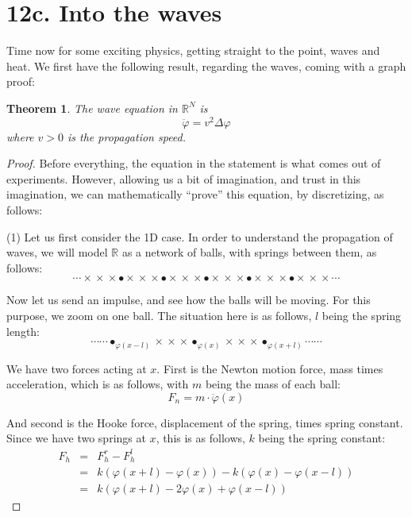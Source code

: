 \documentclass[12pt]{amsbook}
\newtheorem{theorem}{Theorem}[chapter]
\begin{document}
\section*{12c. Into the waves}

Time now for some exciting physics, getting straight to the point, waves and heat. We first have the following result, regarding the waves, coming with a graph proof:


\begin{theorem}
The wave equation in $\mathbb R^N$ is
$$\ddot{\varphi}=v^2\Delta\varphi$$
where $v>0$ is the propagation speed.
\end{theorem}

\begin{proof}
Before everything, the equation in the statement is what comes out of experiments. However, allowing us a bit of imagination, and trust in this imagination, we can mathematically ``prove'' this equation, by discretizing, as follows:

\medskip

(1) Let us first consider the 1D case. In order to understand the propagation of waves, we will model $\mathbb R$ as a network of balls, with springs between them, as follows:
$$\cdots\times\!\!\!\times\!\!\!\times\bullet\times\!\!\!\times\!\!\!\times\bullet\times\!\!\!\times\!\!\!\times\bullet\times\!\!\!\times\!\!\!\times\bullet\times\!\!\!\times\!\!\!\times\bullet\times\!\!\!\times\!\!\!\times\cdots$$

Now let us send an impulse, and see how the balls will be moving. For this purpose, we zoom on one ball. The situation here is as follows, $l$ being the spring length:
$$\cdots\cdots\bullet_{\varphi(x-l)}\times\!\!\!\times\!\!\!\times\bullet_{\varphi(x)}\times\!\!\!\times\!\!\!\times\bullet_{\varphi(x+l)}\cdots\cdots$$

We have two forces acting at $x$. First is the Newton motion force, mass times acceleration, which is as follows, with $m$ being the mass of each ball:
$$F_n=m\cdot\ddot{\varphi}(x)$$

And second is the Hooke force, displacement of the spring, times spring constant. Since we have two springs at $x$, this is as follows, $k$ being the spring constant:
\begin{eqnarray*}
F_h
&=&F_h^r-F_h^l\\
&=&k(\varphi(x+l)-\varphi(x))-k(\varphi(x)-\varphi(x-l))\\
&=&k(\varphi(x+l)-2\varphi(x)+\varphi(x-l))
\end{eqnarray*}


\end{proof}
\end{document}
